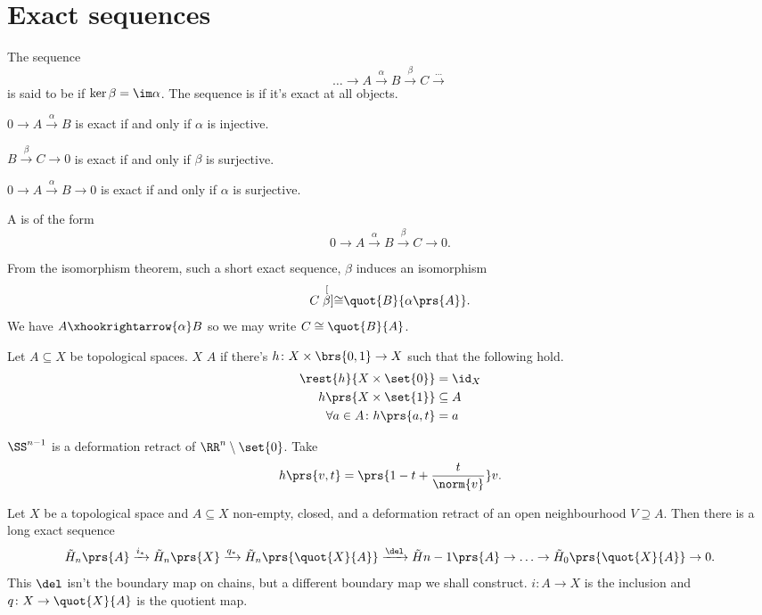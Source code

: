 \documentclass[10pt,a4paper,twoside,openany,hidelinks]{book}
\begin{document}
\section{Exact sequences}
\begin{definition}
The sequence
\[\ldots \rightarrow A \xrightarrow{\alpha} B \xrightarrow{\beta} C \xrightarrow \ldots\]
is said to be  if $\ker \beta = \im \alpha$.
The sequence is  if it's exact at all objects.
\end{definition}
\begin{example}
$0 \to A \xrightarrow{\alpha} B$ is exact if and only if $\alpha$ is injective.
\end{example}
\begin{example}
$B \xrightarrow{\beta} C \to 0$ is exact if and only if $\beta$ is surjective.
\end{example}
\begin{example}
$0 \to A \xrightarrow{\alpha} B \to 0$ is exact if and only if
$\alpha$ is surjective.
\end{example}
\begin{definition}
A  is of the form
\[0 \to A \xrightarrow{\alpha} B \xrightarrow{\beta} C \to 0\text{.}\]
\end{definition}
\begin{remark}
From the isomorphism theorem, such a short exact sequence, $\beta$ induces an isomorphism
\[C \stackrel[\beta]{}{\cong} \quot{B}{\alpha\prs{A}}\text{.}\]
We have $A \xhookrightarrow{\alpha} B$ so we may write $C \cong \quot{B}{A}$.
\end{remark}
\begin{definition}
Let $A \subseteq X$ be topological spaces. $X$  $A$ if there's $h \colon X \times \brs{0,1} \to X$ such that the following hold.
\begin{align*}
\rest{h}{X \times \set{0}} &= \id_X \\
h\prs{X \times \set{1}} &\subseteq A \\
\forall a \in A \colon h\prs{a,t} &= a
\end{align*}
\end{definition}
\begin{example}
$\SS^{n-1}$ is a deformation retract of $\RR^n \setminus \set{0}$. Take \[h\prs{v,t} = \prs{1-t + \frac{t}{\norm{v}}}v\text{.}\]
\end{example}
\begin{theorem}
Let $X$ be a topological space and $A \subseteq X$ non-empty, closed, and a deformation retract of an open neighbourhood $V \supseteq A$. Then there is a long exact sequence
\[\tilde{H}_n\prs{A}\xrightarrow{i_{*}} \tilde{H}_n\prs{X} \xrightarrow{q_*} \tilde{H}_n \prs{\quot{X}{A}} \xrightarrow{\del} \tilde{H}{n-1} \prs{A} \to \ldots \to \tilde{H}_0 \prs{\quot{X}{A}} \to 0 \text{.}\]
This $\del$ isn't the boundary map on chains, but a different boundary map we shall construct. $i \colon A \to X$ is the inclusion and $q \colon X \to \quot{X}{A}$ is the quotient map. 
\end{theorem}
\end{document}
